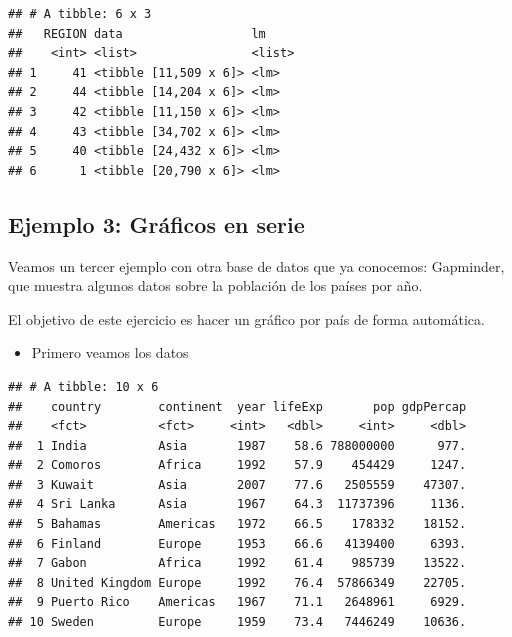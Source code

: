 \documentclass[]{book}
\newenvironment{Shaded}{\begin{snugshade}}{\end{snugshade}}
\newcommand{\DecValTok}[1]{\textcolor[rgb]{0.00,0.00,0.81}{#1}}
\newcommand{\KeywordTok}[1]{\textcolor[rgb]{0.13,0.29,0.53}{\textbf{#1}}}
\newcommand{\NormalTok}[1]{#1}
\newcommand{\OperatorTok}[1]{\textcolor[rgb]{0.81,0.36,0.00}{\textbf{#1}}}
\newcommand{\StringTok}[1]{\textcolor[rgb]{0.31,0.60,0.02}{#1}}
\providecommand{\tightlist}{%
  \setlength{\itemsep}{0pt}\setlength{\parskip}{0pt}}
\begin{document}
\begin{verbatim}
## # A tibble: 6 x 3
##   REGION data                  lm    
##    <int> <list>                <list>
## 1     41 <tibble [11,509 x 6]> <lm>  
## 2     44 <tibble [14,204 x 6]> <lm>  
## 3     42 <tibble [11,150 x 6]> <lm>  
## 4     43 <tibble [34,702 x 6]> <lm>  
## 5     40 <tibble [24,432 x 6]> <lm>  
## 6      1 <tibble [20,790 x 6]> <lm>
\end{verbatim}

\hypertarget{ejemplo-3-graficos-en-serie}{%
\subsection{Ejemplo 3: Gráficos en serie}\label{ejemplo-3-graficos-en-serie}}

Veamos un tercer ejemplo con otra base de datos que ya conocemos: Gapminder, que muestra algunos datos sobre la población de los países por año.

El objetivo de este ejercicio es hacer un gráfico por país de forma automática.

\begin{itemize}
\tightlist
\item
  Primero veamos los datos
\end{itemize}

\begin{Shaded}
\end{Shaded}

\begin{verbatim}
## # A tibble: 10 x 6
##    country        continent  year lifeExp       pop gdpPercap
##    <fct>          <fct>     <int>   <dbl>     <int>     <dbl>
##  1 India          Asia       1987    58.6 788000000      977.
##  2 Comoros        Africa     1992    57.9    454429     1247.
##  3 Kuwait         Asia       2007    77.6   2505559    47307.
##  4 Sri Lanka      Asia       1967    64.3  11737396     1136.
##  5 Bahamas        Americas   1972    66.5    178332    18152.
##  6 Finland        Europe     1953    66.6   4139400     6393.
##  7 Gabon          Africa     1992    61.4    985739    13522.
##  8 United Kingdom Europe     1992    76.4  57866349    22705.
##  9 Puerto Rico    Americas   1967    71.1   2648961     6929.
## 10 Sweden         Europe     1959    73.4   7446249    10636.
\end{verbatim}
\end{document}
